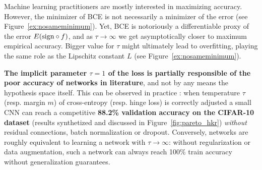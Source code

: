     Machine learning practitioners are mostly interested in maximizing accuracy.%
    However, the minimizer of BCE is not necessarily a minimizer of the error (see Figure~\ref{ex:nosameminimum}). Yet, BCE is notoriously a differentiable proxy of the error $E(\text{sign}\circ f)$, and as $\tau\rightarrow\infty$ we get asymptotically closer to maximum empirical accuracy. Bigger value for $\tau$ might ultimately lead to overfitting, playing the same role as the Lipschitz constant $L$ (see Figure~\ref{ex:nosameminimum}).  
    
      
     \textbf{The implicit parameter $\tau=1$ of the loss is partially responsible of the poor accuracy of \LipCl networks in literature}, and not by any means the hypothesis space \LipCl itself. This can be observed in practice : when temperature $\tau$  (resp. margin $m$) of cross-entropy (resp. hinge loss) is correctly adjusted a small \LipCl CNN can reach a competitive \textbf{88.2\% validation accuracy on the CIFAR-10 dataset} (results synthetized and discussed in Figure~\ref{fig:pareto_hkr}) \textit{without} residual connections, batch normalization or dropout. Conversely, \LipInf networks are roughly equivalent to learning a \LipCl network with $\tau\rightarrow\infty$: without regularization or data augmentation, such a network can always reach 100\% train accuracy without generalization guarantees. %
      
